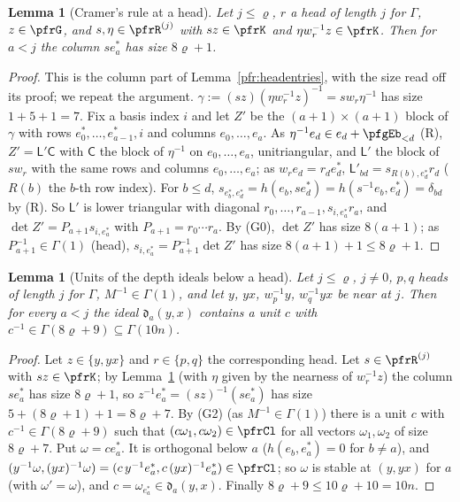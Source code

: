 \documentclass[10pt]{amsart}
\newtheorem{lemma}[theorem]{Lemma}
\theoremstyle{definition}
\theoremstyle{remark}
\begin{document}
\begin{lemma}[Cramer's rule at a head]\label{pfg:cramer}
Let $j\le\varrho$, $r$ a head of length $j$ for $\Gamma$, $z\in\pfrG$, and $s,\eta\in\pfrR^{(j)}$ with $sz\in\pfrK$
and $\eta w_r^{-1}z\in\pfrK$. Then for $a<j$ the column $se^*_a$ has size $8\varrho+1$.
\end{lemma}
\begin{proof}
This is the column part of Lemma~\ref{pfr:headentries}, with the size read off its proof; we repeat the
argument. $\gamma:=(sz)(\eta w_r^{-1}z)^{-1}=sw_r\eta^{-1}$ has size $1+5+1=7$. Fix a basis index $i$ and let
$Z'$ be the $(a+1)\times(a+1)$ block of $\gamma$ with rows $e_0^*,\dots,e^*_{a-1},i$ and columns
$e_0,\dots,e_a$. As $\eta^{-1}e_d\in e_d+\pfgEb_{<d}$ (R), $Z'=\mathsf L'\mathsf C$ with $\mathsf C$ the block
of $\eta^{-1}$ on $e_0,\dots,e_a$, unitriangular, and $\mathsf L'$ the block of $sw_r$ with the same rows and
columns $e_0,\dots,e_a$; as $w_re_d=r_de_d^*$, $\mathsf L'_{bd}=s_{R(b),e^*_d}r_d$ ($R(b)$ the $b$-th row index).
For $b\le d$, $s_{e^*_b,e^*_d}=h(e_b,se^*_d)=h(s^{-1}e_b,e^*_d)=\delta_{bd}$ by (R). So $\mathsf L'$ is lower
triangular with diagonal $r_0,\dots,r_{a-1},s_{i,e^*_a}r_a$, and $\det Z'=P_{a+1}s_{i,e^*_a}$ with
$P_{a+1}=r_0\cdots r_a$. By (G0), $\det Z'$ has size $8(a+1)$; as $P_{a+1}^{-1}\in\Gamma(1)$ (head),
$s_{i,e^*_a}=P_{a+1}^{-1}\det Z'$ has size $8(a+1)+1\le8\varrho+1$.
\end{proof}

\begin{lemma}[Units of the depth ideals below a head]\label{pfg:headunits}
Let $j\le\varrho$, $j\ne0$, $p,q$ heads of length $j$ for $\Gamma$, $M^{-1}\in\Gamma(1)$, and let $y$, $yx$,
$w_p^{-1}y$, $w_q^{-1}yx$ be near at $j$. Then for every $a<j$ the ideal $\mathfrak d_a(y,x)$ contains a unit $c$
with $c^{-1}\in\Gamma(8\varrho+9)\subseteq\Gamma(10n)$.
\end{lemma}
\begin{proof}
Let $z\in\{y,yx\}$ and $r\in\{p,q\}$ the corresponding head. Let $s\in\pfrR^{(j)}$ with $sz\in\pfrK$; by
Lemma~\ref{pfg:cramer} (with $\eta$ given by the nearness of $w_r^{-1}z$) the column $se^*_a$ has size
$8\varrho+1$, so $z^{-1}e^*_a=(sz)^{-1}(se^*_a)$ has size $5+(8\varrho+1)+1=8\varrho+7$. By (G2) (as
$M^{-1}\in\Gamma(1)$) there is a unit $c$ with $c^{-1}\in\Gamma(8\varrho+9)$ such that $(c\omega_1,c\omega_2)\in\pfrCl$
for all vectors $\omega_1,\omega_2$ of size $8\varrho+7$. Put $\omega=ce^*_a$. It is orthogonal below $a$
($h(e_b,e^*_a)=0$ for $b\ne a$), and $(y^{-1}\omega,(yx)^{-1}\omega)=(c\,y^{-1}e^*_a,c\,(yx)^{-1}e^*_a)\in\pfrCl$; so
$\omega$ is stable at $(y,yx)$ for $a$ (with $\omega'=\omega$), and $c=\omega_{e^*_a}\in\mathfrak d_a(y,x)$. Finally
$8\varrho+9\le10\varrho+10=10n$.
\end{proof}
\end{document}
